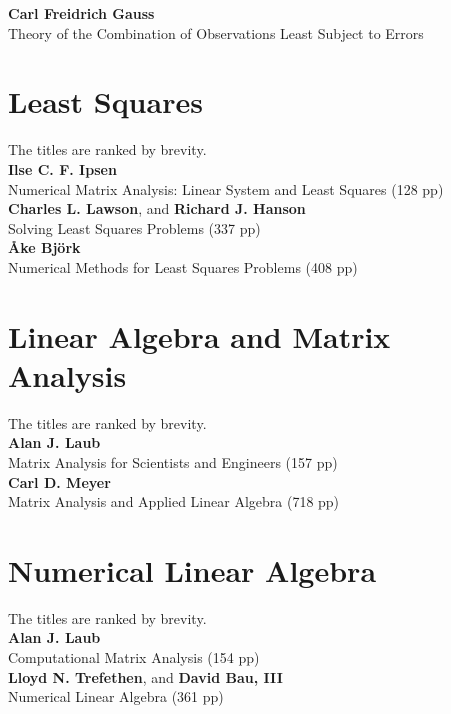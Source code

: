 \noindent
\textbf{Carl Freidrich Gauss}\\
Theory of the Combination of Observations Least Subject to Errors

\section{Least Squares}  %
The titles are ranked by brevity. \\
 
\noindent
\textbf{Ilse C. F. Ipsen}\\
Numerical Matrix Analysis: Linear System and Least Squares (128 pp) \\

\noindent
\textbf{Charles L. Lawson}, and \textbf{Richard J. Hanson}\\
Solving Least Squares Problems (337 pp) \\

\noindent
\textbf{{\AA}ke Bj{\"o}rk}\\
Numerical Methods for Least Squares Problems (408 pp) \\

\section{Linear Algebra and Matrix Analysis}  %
The titles are ranked by brevity. \\

\noindent
\textbf{Alan J. Laub}\\
Matrix Analysis for Scientists and Engineers (157 pp) \\

\noindent
\textbf{Carl D. Meyer}\\
Matrix Analysis and Applied Linear Algebra (718 pp) \\

\section{Numerical Linear Algebra}  %
The titles are ranked by brevity. \\

\noindent
\textbf{Alan J. Laub}\\
Computational Matrix Analysis (154 pp) \\

\noindent
\textbf{Lloyd N. Trefethen}, and \textbf{David Bau, III} \\
Numerical Linear Algebra (361 pp) \\


